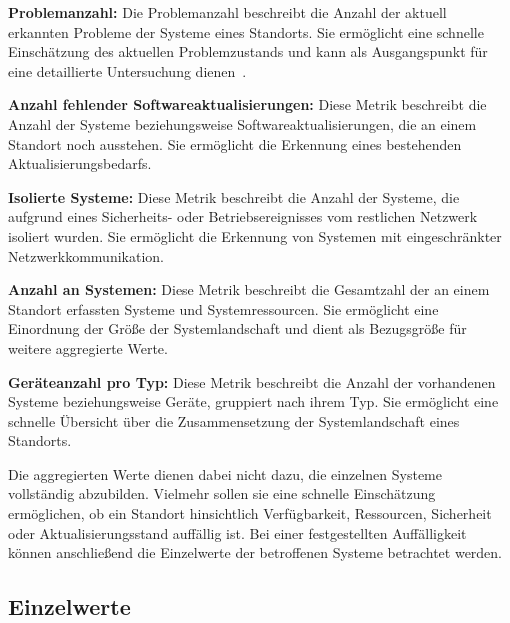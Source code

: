 \begin{compactitem}

    \item \textbf{Problemanzahl:} Die Problemanzahl beschreibt die Anzahl
    der aktuell erkannten Probleme der Systeme eines Standorts.
    Sie ermöglicht eine schnelle Einschätzung des aktuellen
    Problemzustands und kann als Ausgangspunkt für eine detaillierte
    Untersuchung dienen~\cite{zabbix2026problemget}.

    \item \textbf{Anzahl fehlender Softwareaktualisierungen:} Diese
    Metrik beschreibt die Anzahl der Systeme beziehungsweise
    Softwareaktualisierungen, die an einem Standort noch ausstehen.
    Sie ermöglicht die Erkennung eines bestehenden
    Aktualisierungsbedarfs.

    \item \textbf{Isolierte Systeme:} Diese Metrik beschreibt die Anzahl
    der Systeme, die aufgrund eines Sicherheits- oder Betriebsereignisses
    vom restlichen Netzwerk isoliert wurden. Sie ermöglicht die
    Erkennung von Systemen mit eingeschränkter Netzwerkkommunikation.

    \item \textbf{Anzahl an Systemen:} Diese Metrik beschreibt die
    Gesamtzahl der an einem Standort erfassten Systeme und
    Systemressourcen. Sie ermöglicht eine Einordnung der Größe der
    Systemlandschaft und dient als Bezugsgröße für weitere aggregierte
    Werte.

    \item \textbf{Geräteanzahl pro Typ:} Diese Metrik beschreibt die
    Anzahl der vorhandenen Systeme beziehungsweise Geräte, gruppiert
    nach ihrem Typ. Sie ermöglicht eine schnelle Übersicht über die
    Zusammensetzung der Systemlandschaft eines Standorts.

\end{compactitem}

Die aggregierten Werte dienen dabei nicht dazu, die einzelnen Systeme
vollständig abzubilden. Vielmehr sollen sie eine schnelle Einschätzung
ermöglichen, ob ein Standort hinsichtlich Verfügbarkeit, Ressourcen,
Sicherheit oder Aktualisierungsstand auffällig ist. Bei einer
festgestellten Auffälligkeit können anschließend die Einzelwerte der
betroffenen Systeme betrachtet werden.

\subsection{Einzelwerte}
\label{subsec:system-einzelwerte}

